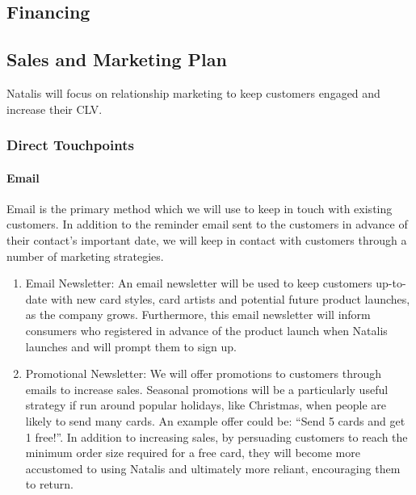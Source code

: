 \documentclass[10pt,a4paper]{article}
\begin{document}
\subsection*{Financing}

\subsection*{Sales and Marketing Plan}
Natalis will focus on relationship marketing to keep customers engaged and increase their CLV.

\subsubsection*{Direct Touchpoints}
\paragraph*{Email}
Email is the primary method which we will use to keep in touch with existing customers. In addition to the reminder email sent to the customers in advance of their contact's important date, we will keep in contact with customers through a number of marketing strategies.
\begin{enumerate}
	\item Email Newsletter: An email newsletter will be used to keep customers up-to-date with new card styles, card artists and potential future product launches, as the company grows. Furthermore, this email newsletter will inform consumers who registered in advance of the product launch when Natalis launches and will prompt them to sign up.
	\item Promotional Newsletter: We will offer promotions to customers through emails to increase sales. Seasonal promotions will be a particularly useful strategy if run around popular holidays, like Christmas, when people are likely to send many cards. An example offer could be: ``Send 5 cards and get 1 free!''. In addition to increasing sales, by persuading customers to reach the minimum order size required for a free card, they will become more accustomed to using Natalis and ultimately more reliant, encouraging them to return.
\end{enumerate}
\end{document}

